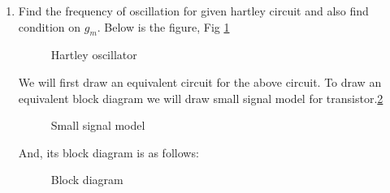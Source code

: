 \begin{enumerate}[label=\arabic*.,ref=\theenumi]
\item Find the frequency of oscillation for given hartley circuit and also find condition on $g_m$.\newline 
Below is the figure, Fig \ref{fig:ee18btech11019_fig1}

\begin{figure}[!ht]
	\begin{center}
		\resizebox{\columnwidth}{!}{}
	\end{center}
\caption{Hartley oscillator}
\label{fig:ee18btech11019_fig1}
\end{figure}
\solution We will first draw an equivalent circuit for the above circuit.\newline
To draw an equivalent block diagram we will draw small signal model for transistor.\ref{fig:ee18btech11019_fig2}
\begin{figure}[!ht]
	\begin{center}
		\resizebox{\columnwidth}{!}{}
	\end{center}
\caption{Small signal model}
\label{fig:ee18btech11019_fig2}
\end{figure}
And, its block diagram is as follows: \newline

\begin{figure}[!ht]
	\begin{center}
		\resizebox{\columnwidth}{!}{}
	\end{center}
\caption{Block diagram}
\label{fig:ee18btech11019_fig3}
\end{figure}


\end{enumerate}
